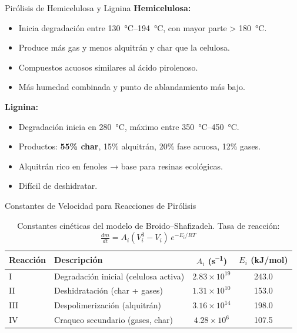 \documentclass[../../main.tex]{subfiles}
\begin{document}
\begin{frame}{Pirólisis de Hemicelulosa y Lignina}
\small
\textbf{Hemicelulosa:}
\begin{itemize}
  \item Inicia degradación entre \SI{130}{\degreeCelsius}–\SI{194}{\degreeCelsius}, con mayor parte > \SI{180}{\degreeCelsius}.
  \item Produce más gas y menos alquitrán y char que la celulosa.
  \item Compuestos acuosos similares al ácido pirolenoso.
  \item Más humedad combinada y punto de ablandamiento más bajo.
\end{itemize}

\vspace{0.2cm}
\textbf{Lignina:}
\begin{itemize}
  \item Degradación inicia en \SI{280}{\degreeCelsius}, máximo entre \SI{350}{\degreeCelsius}–\SI{450}{\degreeCelsius}.
  \item Productos: \textbf{55\% char}, 15\% alquitrán, 20\% fase acuosa, 12\% gases.
  \item Alquitrán rico en fenoles → base para resinas ecológicas.
  \item Difícil de deshidratar.
\end{itemize}
\end{frame}

\begin{frame}{Constantes de Velocidad para Reacciones de Pirólisis}
\small
\begin{table}[h]
\centering
\begin{tabular}{@{}llcc@{}}
\toprule
\textbf{Reacción} & \textbf{Descripción} & $A_i$ (s\textsuperscript{–1}) & $E_i$ (kJ/mol) \\ \midrule
I & Degradación inicial (celulosa activa) & $2.83\times10^{19}$ & 243.0 \\
II & Deshidratación (char + gases) & $1.31\times10^{10}$ & 153.0 \\
III & Despolimerización (alquitrán) & $3.16\times10^{14}$ & 198.0 \\
IV & Craqueo secundario (gases, char) & $4.28\times10^{6}$ & 107.5 \\
\bottomrule
\end{tabular}
\caption{Constantes cinéticas del modelo de Broido–Shafizadeh. Tasa de reacción: $\frac{dm}{dt} = A_i (V_i^3 - V_i)\, e^{-E_i/RT}$}
\end{table}
\end{frame}
\end{document}
